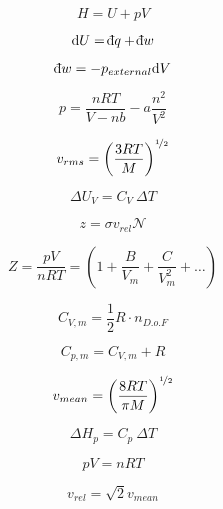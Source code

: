 \documentclass[12pt, letterpaper]{memoir}
\begin{document}
\noindent
\begin{minipage}{0.5\linewidth}
\begin{equation*}
	H = U + pV
\end{equation*}	

\begin{equation*}
	\mathrm{d} U = \dbar q + \dbar w
\end{equation*}	

\begin{equation*}
	\dbar w = -p_{external} \mathrm{d}V
\end{equation*}	

\begin{equation*}
	p = \frac{nRT}{V-nb} - a\frac{n^2}{V^2}
\end{equation*}

\begin{equation*}
	v_{rms} = \left(\frac{3RT}{M}\right)^{\nicefrac{1}{2}}
\end{equation*}

\begin{equation*}
	\Delta U_V = C_V~\Delta T
\end{equation*}	

\begin{equation*}
	z = \sigma v_{rel}\mathcal{N}
\end{equation*}



\end{minipage}
\begin{minipage}{0.5\linewidth}
\begin{equation*}
	Z=\dfrac{pV}{nRT}=\left(1+\dfrac{B}{V_m} + \dfrac{C}{V_m^2}+\ldots\right)
\end{equation*}	

\begin{equation*}
	C_{V,m} = \dfrac{1}{2}R\cdot n_{D.o.F}
\end{equation*}

\begin{equation*}
	C_{p,m} = C_{V,m}+R
\end{equation*}	

\begin{equation*}
	v_{mean} = \left(\frac{8RT}{\pi M}\right)^{\nicefrac{1}{2}}
\end{equation*}

\begin{equation*}
	\Delta H_p= C_p~\Delta T
\end{equation*}	

\begin{equation*}
	pV=nRT
\end{equation*}

\begin{equation*}
	v_{rel} = \sqrt{2}v_{mean}
\end{equation*}




\end{minipage}
\end{document}
